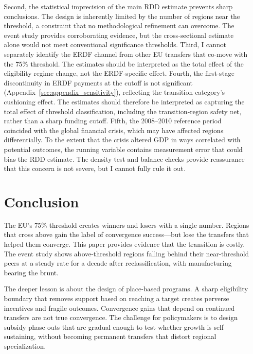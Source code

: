 \documentclass[12pt]{article}
\begin{document}
Second, the statistical imprecision of the main RDD estimate prevents sharp conclusions. The design is inherently limited by the number of regions near the threshold, a constraint that no methodological refinement can overcome. The event study provides corroborating evidence, but the cross-sectional estimate alone would not meet conventional significance thresholds. Third, I cannot separately identify the ERDF channel from other EU transfers that co-move with the 75\% threshold. The estimates should be interpreted as the total effect of the eligibility regime change, not the ERDF-specific effect. Fourth, the first-stage discontinuity in ERDF payments at the cutoff is not significant (Appendix~\ref{sec:appendix_sensitivity}), reflecting the transition category's cushioning effect. The estimates should therefore be interpreted as capturing the total effect of threshold classification, including the transition-region safety net, rather than a sharp funding cutoff. Fifth, the 2008--2010 reference period coincided with the global financial crisis, which may have affected regions differentially. To the extent that the crisis altered GDP in ways correlated with potential outcomes, the running variable contains measurement error that could bias the RDD estimate. The density test and balance checks provide reassurance that this concern is not severe, but I cannot fully rule it out.

\section{Conclusion}
\label{sec:conclusion}

The EU's 75\% threshold creates winners and losers with a single number. Regions that cross above gain the label of convergence success---but lose the transfers that helped them converge. This paper provides evidence that the transition is costly. The event study shows above-threshold regions falling behind their near-threshold peers at a steady rate for a decade after reclassification, with manufacturing bearing the brunt.

The deeper lesson is about the design of place-based programs. A sharp eligibility boundary that removes support based on reaching a target creates perverse incentives and fragile outcomes. Convergence gains that depend on continued transfers are not true convergence. The challenge for policymakers is to design subsidy phase-outs that are gradual enough to test whether growth is self-sustaining, without becoming permanent transfers that distort regional specialization.
\end{document}
